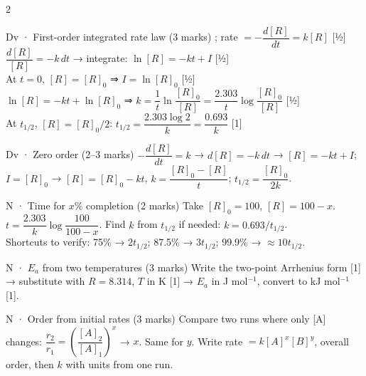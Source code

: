 \documentclass[10pt,a4paper]{extarticle}
\newcommand{\mk}[1]{{\scriptsize\color{black!55}[#1]}}
\begin{document}
\begin{multicols}{2}
\begin{skel}{Dv · First-order integrated rate law (3 marks)}
; \;rate $=-\dfrac{d[R]}{dt}=k[R]$ \mk{½}\\
$\dfrac{d[R]}{[R]}=-k\,dt$ → integrate: $\ln[R]=-kt+I$ \mk{½}\\
At $t=0$, $[R]=[R]_0$ ⇒ $I=\ln[R]_0$ \mk{½}\\
$\ln[R]=-kt+\ln[R]_0$ ⇒ $k=\dfrac1t\ln\dfrac{[R]_0}{[R]}=\boxed{\dfrac{2.303}{t}\log\dfrac{[R]_0}{[R]}}$ \mk{½}\\
At $t_{1/2}$, $[R]=[R]_0/2$: $t_{1/2}=\dfrac{2.303\log2}{k}=\boxed{\dfrac{0.693}{k}}$ \mk{1}
\end{skel}
\begin{skel}{Dv · Zero order (2--3 marks)}
$-\dfrac{d[R]}{dt}=k$ → $d[R]=-k\,dt$ → $[R]=-kt+I$; $I=[R]_0$ → $[R]=[R]_0-kt$, $k=\dfrac{[R]_0-[R]}{t}$; $t_{1/2}=\dfrac{[R]_0}{2k}$.
\end{skel}
\begin{skel}{N · Time for $x$\% completion (2 marks)}
Take $[R]_0=100$, $[R]=100-x$. \;$t=\dfrac{2.303}{k}\log\dfrac{100}{100-x}$. Find $k$ from $t_{1/2}$ if needed: $k=0.693/t_{1/2}$.\\
Shortcuts to verify: 75\% → $2t_{1/2}$; 87.5\% → $3t_{1/2}$; 99.9\% → $\approx10t_{1/2}$.
\end{skel}
\begin{skel}{N · $E_a$ from two temperatures (3 marks)}
Write the two-point Arrhenius form \mk{1} → substitute with $R=8.314$, $T$ in K \mk{1} → $E_a$ in J mol$^{-1}$, convert to kJ mol$^{-1}$ \mk{1}.
\end{skel}
\begin{skel}{N · Order from initial rates (3 marks)}
Compare two runs where only [A] changes: $\dfrac{r_2}{r_1}=\left(\dfrac{[A]_2}{[A]_1}\right)^x$ → $x$. Same for $y$. Write rate $=k[A]^x[B]^y$, overall order, then $k$ with units from one run.
\end{skel}


\end{multicols}
\end{document}
